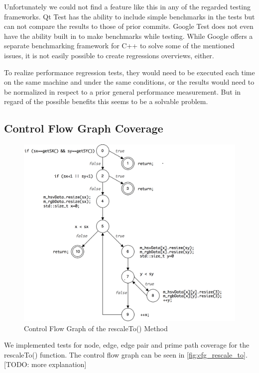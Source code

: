 \documentclass{scrreprt}
\begin{document}
Unfortunately we could not find a feature like this in any of the regarded testing frameworks. Qt Test has the ability to include simple benchmarks in the tests but can not compare the results to those of prior commits. Google Test does not even have the ability built in to make benchmarks while testing. While Google offers a separate benchmarking framework for C++ to solve some of the mentioned issues, it is not easily possible to create regressions overviews, either.

To realize performance regression tests, they would need to be executed each time on the same machine and under the same conditions, or the results would need to be normalized in respect to a prior general performance measurement. But in regard of the possible benefits this seems to be a solvable problem.

\subsection{Control Flow Graph Coverage}

\begin{figure}[h]
	\centering
	\includegraphics[width=1.0\textwidth]{img/cfg_rescale_to}
	\caption[Control Flow Graph rescaleTo()]{Control Flow Graph of the rescaleTo() Method}
	\label{fig:cfg_rescale_to}
\end{figure}

We implemented tests for node, edge, edge pair and prime path coverage for the rescaleTo() function. The control flow graph can be seen in \vref{fig:cfg_rescale_to}. [TODO: more explanation]
\end{document}
